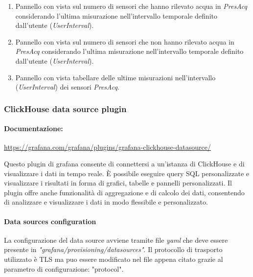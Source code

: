 \begin{enumerate}
\begin{enumerate}
\item Pannello con vista sul numero di sensori che hanno rilevato acqua in \textit{PresAcq} considerando l'ultima misurazione nell'intervallo temporale definito dall'utente (\textit{UserInterval}).
\item Pannello con vista sul numero di sensori che non hanno rilevato acqua in \textit{PresAcq} considerando l'ultima misurazione nell'intervallo temporale definito dall'utente (\textit{UserInterval}).
\item Pannello con vista tabellare delle ultime misurazioni nell'intervallo (\textit{UserInterval}) dei sensori \textit{PresAcq}.
\end{enumerate}
\end{enumerate}



\subsubsection{ClickHouse data source plugin} \label{sec:click_plugin}
\paragraph{Documentazione:}
\href{https://grafana.com/grafana/plugins/grafana-clickhouse-datasource/}{https://grafana.com/grafana/plugins/grafana-clickhouse-datasource/}

Questo plugin di grafana consente di connettersi a un'istanza di ClickHouse e di visualizzare i dati in tempo reale. È possibile eseguire query SQL personalizzate e visualizzare i risultati in forma di grafici, tabelle e pannelli personalizzati. Il plugin offre anche funzionalità di aggregazione e di calcolo dei dati, consentendo di analizzare e visualizzare i dati in modo flessibile e personalizzato.

\paragraph{Data sources configuration}
La configurazione del data source avviene tramite file \textit{yaml} che deve essere presente in \textit{"grafana/provisioning/datasources"}.
Il protocollo di trasporto utilizzato è TLS ma puo essere modificato nel file appena citato grazie al parametro di configurazione: "protocol".

